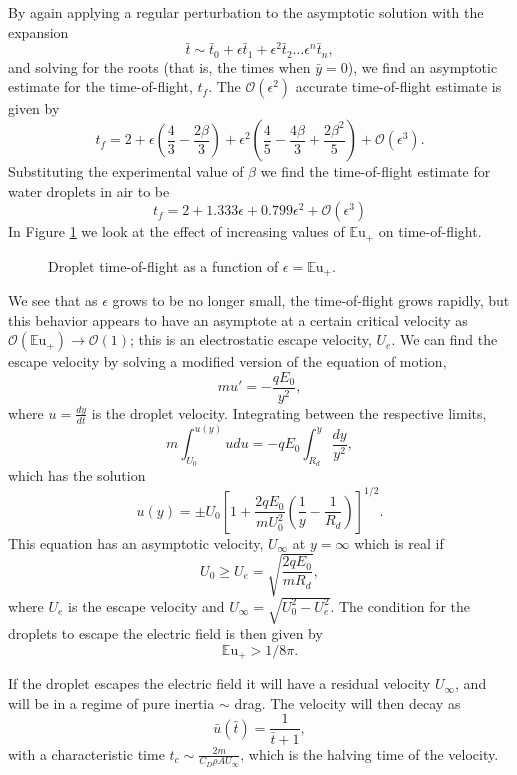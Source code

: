 \documentclass[a4paper, 12pt]{article}
\begin{document}
By again applying a regular perturbation to the asymptotic solution with the expansion
\[ \bar{t} \sim \bar{t}_0 + \epsilon \bar{t}_1 + \epsilon^2 \bar{t}_2 \ldots \epsilon^n\bar{t}_n  
,\]
and solving for the roots (that is, the times when $\bar{y} = 0$), we find an asymptotic estimate for the time-of-flight, $t_f$. The $\mathcal{O}(\epsilon^2)$ accurate time-of-flight estimate is given by
\[t_f = 2 + \epsilon \left(\frac{4}{3} - \frac{2 \beta}{3}\right) + \epsilon^{2} \left(\frac{4}{5} - \frac{4 \beta}{3} + \frac{2 \beta^{2}}{5}\right) + \mathcal{O}(\epsilon^3).\]
Substituting the experimental value of $\beta$ we find the time-of-flight estimate for water droplets in air to be
\begin{equation} \label{time_of_flight}
t_f = 2 + 1.333 \epsilon + 0.799 \epsilon^{2} + \mathcal{O}(\epsilon^3) 
\end{equation} 
In Figure \ref{fig:drag} we look at the effect of increasing values of ${\mathbb{E}\mbox{u}}_+$ on time-of-flight.
\begin{figure}[htb]
    \centering
    
    \caption{Droplet time-of-flight as a function of $\epsilon = {\mathbb{E}\mbox{u}}_+$.}
    \label{fig:drag}
\end{figure}
We see that as $\epsilon$ grows to be no longer small, the time-of-flight grows rapidly, but this behavior appears to have an asymptote at a certain critical velocity as $\mathcal{O}({\mathbb{E}\mbox{u}}_+) \rightarrow \mathcal{O}(1)$; this is an electrostatic escape velocity, $U_e$. We can find the escape velocity by solving a modified version of the equation of motion,
\[ m u' = - \frac{q E_0}{y^2}, \]
where $u = \frac{d y}{d t}$ is the droplet velocity. Integrating between the respective limits,
\[m \int^{u(y)}_{U_0} u du = -q E_0 \int^y_{R_d} \frac{dy}{y^2} ,\]
which has the solution
\[ u(y) = \pm U_0 \left[1 + \frac{2q E_0}{m U_0^2} \left( \frac{1}{y} - \frac{1}{R_d} \right) \right]^{1/2}.
\]
This equation has an asymptotic velocity, $U_{\infty}$ at $y = \infty$ which is real if 
\[ U_0 \geq  U_e = \sqrt{\frac{2 q E_0}{m R_d}},
\]
where $U_e$ is the escape velocity and $U_{\infty} = \sqrt{U_0^2 - U_e^2}$. The condition for the droplets to escape the electric field is then given by
\begin{equation}\label{escape}
{\mathbb{E}\mbox{u}}_+ > 1/8 \pi.
\end{equation}
 
If the droplet escapes the electric field it will have a residual velocity $U_{\infty}$, and will be in a regime of pure inertia $\sim$ drag. The velocity will then decay as
\[
\bar{u}(\bar{t}) = \frac{1}{\bar{t} + 1},
\]
with a characteristic time $t_c \sim \frac{2 m}{C_D \rho A U_{\infty}}$, which is the halving time of the velocity. 

\printbibliography
\end{document}
